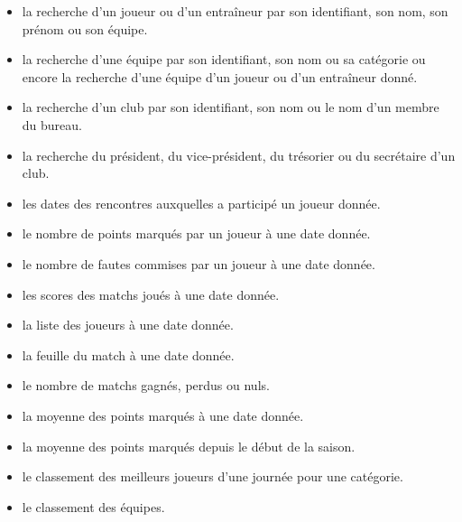 \documentclass{article}
\begin{document}
\begin{itemize}

\item la recherche d'un joueur ou d'un entraîneur par son identifiant, son nom, son prénom ou son équipe. \\

\item la recherche d'une équipe par son identifiant, son nom ou sa catégorie ou encore la recherche d'une équipe d'un joueur ou d'un entraîneur donné. \\

\item la recherche d'un club par son identifiant, son nom ou le nom d'un membre du bureau. \\

\item la recherche du président, du vice-président, du trésorier ou du secrétaire d'un club. \\

\item les dates des rencontres auxquelles a participé un joueur donnée. \\

\item le nombre de points marqués par un joueur à une date donnée. \\

\item le nombre de fautes commises par un joueur à une date donnée. \\

\item les scores des matchs joués à une date donnée. \\


\item la liste des joueurs à une date donnée. \\


\item la feuille du match à une date donnée. \\


\item le nombre de matchs gagnés, perdus ou nuls. \\


\item la moyenne des points marqués à une date donnée. \\


\item la moyenne des points marqués depuis le début de la saison. \\


\item le classement des meilleurs joueurs d’une journée pour une catégorie. \\


\item le classement des équipes. \\


\end{itemize}
\end{document}
